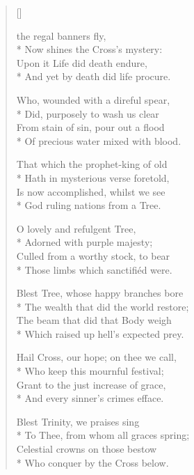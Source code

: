 \newHymn
{}

\begin{verse}[\versewidth]

 the regal banners fly,\\*
Now shines the Cross's mystery:     \\
Upon it Life did death endure,         \\*      
And yet by death did life procure. 
\pointorig

Who, wounded with a direful spear,        \\*   
Did, purposely to wash us clear               \\
From stain of sin, pour out a flood          \\*
Of precious water mixed with blood.          

That which the prophet-king of old           \\*
Hath in mysterious verse foretold,           \\
Is now accomplished, whilst we see           \\*
God ruling nations from a Tree.          

O lovely and refulgent Tree,                 \\*
Adorned with purple majesty;                \\
Culled from a worthy stock, to bear          \\*
Those limbs which sanctifiéd were.           

Blest Tree, whose happy branches bore        \\*
The wealth that did the world restore;       \\
The beam that did that Body weigh            \\*
Which raised up hell's expected prey.        

Hail Cross, our hope; on thee we call,\\*
Who keep this mournful festival;\\
Grant to the just increase of grace,         \\*
And every sinner's crimes efface.            

Blest Trinity, we praises sing\\*
To Thee, from whom all graces spring;\\
Celestial crowns on those bestow\\*
Who conquer by the Cross below.


\end{verse}


